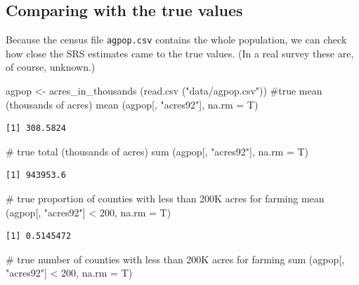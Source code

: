 \documentclass[
  letterpaper,
  DIV=11,
  numbers=noendperiod]{scrreprt}
\newenvironment{Shaded}{\begin{snugshade}}{\end{snugshade}}
\newcommand{\AttributeTok}[1]{\textcolor[rgb]{0.40,0.45,0.13}{#1}}
\newcommand{\CommentTok}[1]{\textcolor[rgb]{0.37,0.37,0.37}{#1}}
\newcommand{\DecValTok}[1]{\textcolor[rgb]{0.68,0.00,0.00}{#1}}
\newcommand{\FunctionTok}[1]{\textcolor[rgb]{0.28,0.35,0.67}{#1}}
\newcommand{\NormalTok}[1]{\textcolor[rgb]{0.00,0.23,0.31}{#1}}
\newcommand{\OtherTok}[1]{\textcolor[rgb]{0.00,0.23,0.31}{#1}}
\newcommand{\SpecialCharTok}[1]{\textcolor[rgb]{0.37,0.37,0.37}{#1}}
\newcommand{\StringTok}[1]{\textcolor[rgb]{0.13,0.47,0.30}{#1}}
\renewcommand{\[}{\begin{equation}}
\renewcommand{\]}{\end{equation}}
\begin{document}
\subsection{Comparing with the true
values}\label{comparing-with-the-true-values}

Because the census file \texttt{agpop.csv} contains the whole
population, we can check how close the SRS estimates came to the true
values. (In a real survey these are, of course, unknown.)

\begin{Shaded}
\begin{Highlighting}[]
\NormalTok{agpop }\OtherTok{\textless{}{-}} \FunctionTok{acres\_in\_thousands}\NormalTok{ (}\FunctionTok{read.csv}\NormalTok{ (}\StringTok{"data/agpop.csv"}\NormalTok{))}
\CommentTok{\#true mean (thousands of acres)}
\FunctionTok{mean}\NormalTok{ (agpop[, }\StringTok{"acres92"}\NormalTok{], }\AttributeTok{na.rm =}\NormalTok{ T)}
\end{Highlighting}
\end{Shaded}

\begin{verbatim}
[1] 308.5824
\end{verbatim}

\begin{Shaded}
\begin{Highlighting}[]
\CommentTok{\# true total (thousands of acres)}
\FunctionTok{sum}\NormalTok{ (agpop[, }\StringTok{"acres92"}\NormalTok{], }\AttributeTok{na.rm =}\NormalTok{ T)}
\end{Highlighting}
\end{Shaded}

\begin{verbatim}
[1] 943953.6
\end{verbatim}

\begin{Shaded}
\begin{Highlighting}[]
\CommentTok{\# true proportion of counties with less than 200K acres for farming}
\FunctionTok{mean}\NormalTok{ (agpop[, }\StringTok{"acres92"}\NormalTok{] }\SpecialCharTok{\textless{}} \DecValTok{200}\NormalTok{, }\AttributeTok{na.rm =}\NormalTok{ T)}
\end{Highlighting}
\end{Shaded}

\begin{verbatim}
[1] 0.5145472
\end{verbatim}

\begin{Shaded}
\begin{Highlighting}[]
\CommentTok{\# true number of counties with less than 200K acres for farming}
\FunctionTok{sum}\NormalTok{ (agpop[, }\StringTok{"acres92"}\NormalTok{] }\SpecialCharTok{\textless{}} \DecValTok{200}\NormalTok{, }\AttributeTok{na.rm =}\NormalTok{ T)}
\end{Highlighting}
\end{Shaded}
\end{document}

